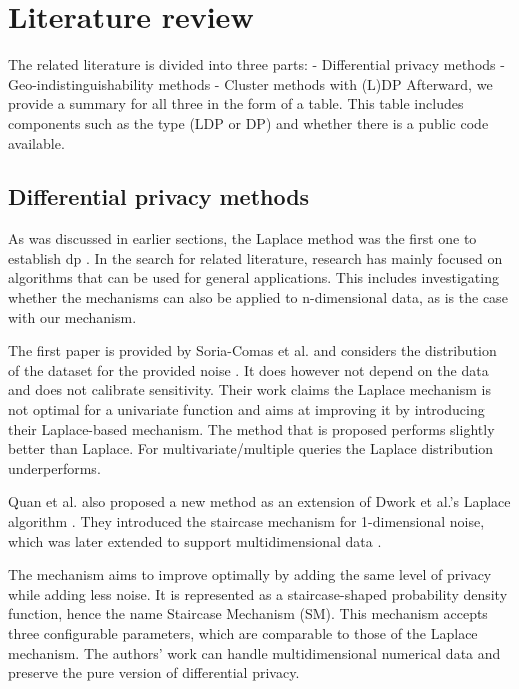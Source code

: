 \section{Literature review}
The related literature is divided into three parts:
- Differential privacy methods
- Geo-indistinguishability methods
- Cluster methods with (L)DP
Afterward, we provide a summary for all three in the form of a table.
This table includes components such as the type (LDP or DP) and whether there is a public code available.

\subsection{Differential privacy methods}
As was discussed in earlier sections, the Laplace method was the first one to establish \gls{dp} \citep{dwork_differential_2006}.
In the search for related literature, research has mainly focused on algorithms that can be used for general applications.
This includes investigating whether the mechanisms can also be applied to n-dimensional data, as is the case with our mechanism.

The first paper is provided by Soria-Comas et al. and considers the distribution of the dataset for the provided noise \citep{soria-comas_optimal_2013}.
It does however not depend on the data and does not calibrate sensitivity.
Their work claims the Laplace mechanism is not optimal for a univariate function and aims at improving it by introducing their Laplace-based mechanism.
The method that is proposed performs slightly better than Laplace.
For multivariate/multiple queries the Laplace distribution underperforms.

Quan et al. also proposed a new method as an extension of Dwork et al.'s Laplace algorithm \citep{geng_staircase_2013}.
They introduced the staircase mechanism for 1-dimensional noise, which was later extended to support multidimensional data \citep{geng_staircase_2015}.

The mechanism aims to improve optimally by adding the same level of privacy while adding less noise.
It is represented as a staircase-shaped probability density function, hence the name Staircase Mechanism (SM).
This mechanism accepts three configurable parameters, which are comparable to those of the Laplace mechanism.
The authors' work can handle multidimensional numerical data and preserve the pure version of differential privacy.

